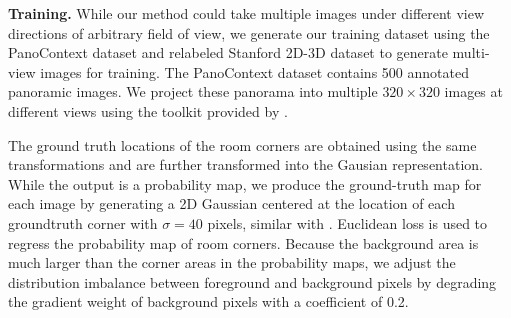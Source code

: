 \noindent\textbf{Training.} 
While our method could take multiple images under different view directions of arbitrary field of view, we generate our training dataset using the PanoContext dataset \cite{zhang2014panocontext} and relabeled Stanford 2D-3D dataset \cite{layoutnet} to generate multi-view images for training. 
The PanoContext dataset contains 500 annotated panoramic images. We project these panorama into multiple $320 \times 320$ images at different views using the toolkit provided by \cite{zhang2014panocontext}. 
 

The ground truth locations of the room corners are obtained using the same transformations and are further transformed into the Gausian representation. 
While the output is a probability map, we produce the ground-truth map for each image by generating a 2D Gaussian centered at the location of each groundtruth corner with $\sigma=40$ pixels, similar with \cite{LeeRoomNet17,tompson2014joint,pfister2015flowing}.
%
Euclidean loss is used to regress the probability map of room corners. 
Because the background area is much larger than the corner areas in the probability maps, we adjust the distribution imbalance between foreground and background pixels by degrading the gradient weight of background pixels with a coefficient of 0.2.
 




